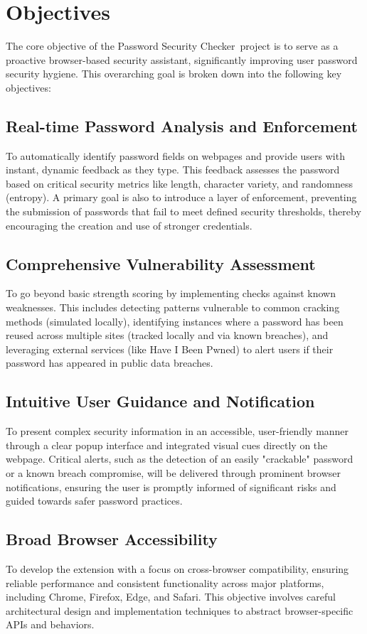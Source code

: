 \documentclass[11pt,oneside,a4paper]{book}
\newcommand{\extensionname}{Password Security Checker}
\begin{document}
\chapter{Objectives}
The core objective of the \extensionname\ project is to serve as a proactive browser-based security assistant, significantly improving user password security hygiene. This overarching goal is broken down into the following key objectives:

\section{Real-time Password Analysis and Enforcement}
To automatically identify password fields on webpages and provide users with instant, dynamic feedback as they type. This feedback assesses the password based on critical security metrics like length, character variety, and randomness (entropy). A primary goal is also to introduce a layer of enforcement, preventing the submission of passwords that fail to meet defined security thresholds, thereby encouraging the creation and use of stronger credentials.

\section{Comprehensive Vulnerability Assessment}
To go beyond basic strength scoring by implementing checks against known weaknesses. This includes detecting patterns vulnerable to common cracking methods (simulated locally), identifying instances where a password has been reused across multiple sites (tracked locally and via known breaches), and leveraging external services (like Have I Been Pwned) to alert users if their password has appeared in public data breaches.

\section{Intuitive User Guidance and Notification}
To present complex security information in an accessible, user-friendly manner through a clear popup interface and integrated visual cues directly on the webpage. Critical alerts, such as the detection of an easily "crackable" password or a known breach compromise, will be delivered through prominent browser notifications, ensuring the user is promptly informed of significant risks and guided towards safer password practices.

\section{Broad Browser Accessibility}
To develop the extension with a focus on cross-browser compatibility, ensuring reliable performance and consistent functionality across major platforms, including Chrome, Firefox, Edge, and Safari. This objective involves careful architectural design and implementation techniques to abstract browser-specific APIs and behaviors.
\end{document}
